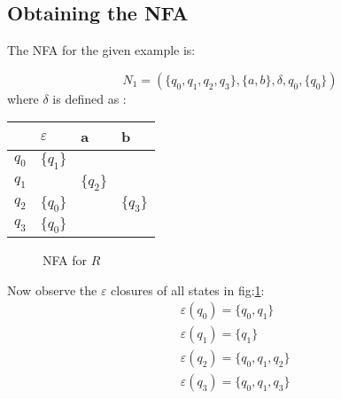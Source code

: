 \subsection*{Obtaining the NFA}
The NFA for the given example is:

$$
N_1 = (\{q_0,q_1, q_2, q_3\}, \{a,b\}, \delta, q_0, \{q_0\})
$$
where $\delta$ is defined as : 

\begin{tabular}{|l|l|l|l|}
\hline
     & $\varepsilon$ & a        & b        \\\hline
$q_0$ & $\{q_1\}$                   &          &          \\
$q_1$ &                            & $\{q_2\}$ &          \\
$q_2$ & $\{q_0\}$                   &          & $\{q_3\}$ \\
$q_3$ & $\{q_0\}$                   &          &        \\ \hline
\end{tabular}

\begin{figure}[ht]
\centering
{}
\caption{NFA for $R$}
\label{fig:nfa}
\end{figure}

Now observe the $\varepsilon$ closures of all states in fig:\ref{fig:nfa}:
\begin{equation}
\label{eq:closure}
\begin{split}
&\varepsilon (q_0) = \{q_0, q_1\} \\
&\varepsilon (q_1) = \{q_1\} \\
&\varepsilon (q_2) = \{q_0, q_1, q_2\} \\
&\varepsilon (q_3) = \{q_0, q_1, q_3\} \\
\end{split}
\end{equation}
